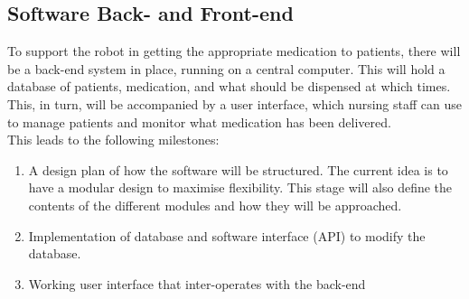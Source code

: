 \documentclass[a4paper,10pt,DIV10,openright,openbib]{scrreprt}
\begin{document}
\subsection{Software Back- and Front-end}
To support the robot in getting the appropriate medication to patients, there will
be a back-end system in place, running on a central computer. This will hold a 
database of patients, medication, and what should be dispensed at which times. This, in
turn, will be accompanied by a user interface, which nursing staff can use to manage patients
and monitor what medication has been delivered. \\
This leads to the following milestones:
\begin{enumerate}
  \item A design plan of how the software will be structured. The current idea is to have a 
  modular design to maximise flexibility. This stage will also define the contents of 
  the different modules and how they will be approached.
  \item Implementation of database and software interface (API) to modify the database.
  \item Working user interface that inter-operates with the back-end
\end{enumerate}


\end{document}
